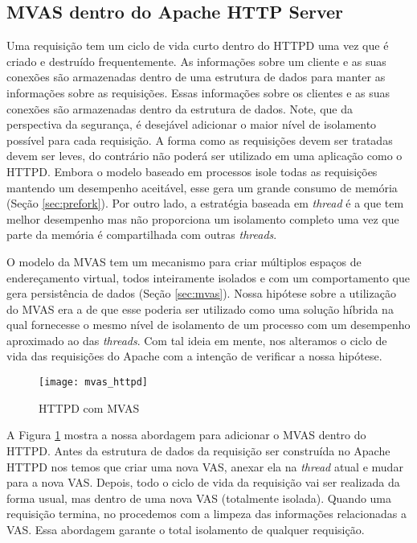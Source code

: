\subsection{MVAS dentro do Apache HTTP Server}

Uma requisição tem um ciclo de vida curto dentro do HTTPD uma vez que é criado
e destruído frequentemente. As informações sobre um cliente e as suas conexões
são armazenadas dentro de uma estrutura de dados para manter as informações
sobre as requisições. Essas informações sobre os clientes e as suas conexões
são armazenadas dentro da estrutura de dados. Note, que da perspectiva da
segurança, é desejável adicionar o maior nível de isolamento possível para cada
requisição. A forma como as requisições devem ser tratadas devem ser leves, do
contrário não poderá ser utilizado em uma aplicação como o HTTPD. Embora o
modelo baseado em processos isole todas as requisições mantendo um desempenho
aceitável, esse gera um grande consumo de memória (Seção \ref{sec:prefork}).
Por outro lado, a estratégia baseada em \emph{thread} é a que tem melhor
desempenho mas não proporciona um isolamento completo uma vez que parte da
memória é compartilhada com outras \emph{threads}.

O modelo da MVAS tem um mecanismo para criar múltiplos espaços de endereçamento
virtual, todos inteiramente isolados e com um comportamento que gera
persistência de dados (Seção \ref{sec:mvas}). Nossa hipótese sobre a utilização
do MVAS era a de que esse poderia ser utilizado como uma solução híbrida na
qual fornecesse o mesmo nível de isolamento de um processo com um desempenho
aproximado ao das \emph{threads}. Com tal ideia em mente, nos alteramos o ciclo
de vida das requisições do Apache com a intenção de verificar a nossa hipótese.

\begin{figure}[!h] \centering \texttt{[image: mvas\_httpd]}
\caption{HTTPD com MVAS} \label{fig:httpd_mvas} \end{figure}

A Figura \ref{fig:httpd_mvas} mostra a nossa abordagem para adicionar o MVAS
dentro do HTTPD. Antes da estrutura de dados da requisição ser construída no
Apache HTTPD nos temos que criar uma nova VAS, anexar ela na \emph{thread}
atual e mudar para a nova VAS. Depois, todo o ciclo de vida da requisição vai
ser realizada da forma usual, mas dentro de uma nova VAS (totalmente isolada).
Quando uma requisição termina, no procedemos com a limpeza das informações
relacionadas a VAS. Essa abordagem garante o total isolamento de qualquer
requisição.

